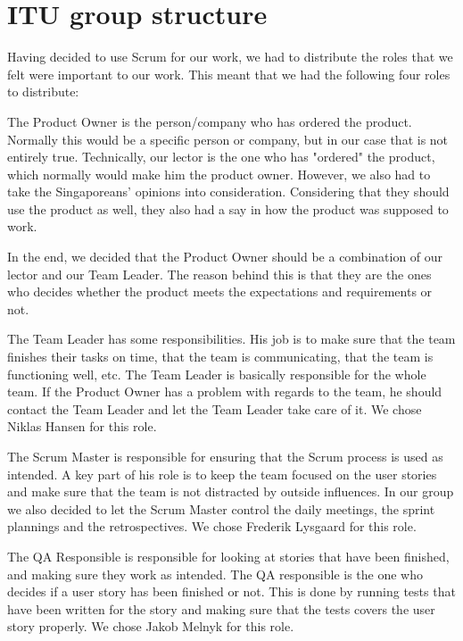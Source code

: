\section{ITU group structure}
\label{Collaboration_ITU}
Having decided to use Scrum for our work, we had to distribute the roles that we felt were important to our work. This meant that we had the following four roles to distribute:
\begin{my_description}
\item[Product Owner]
The Product Owner is the person/company who has ordered the product. Normally this would be a specific person or company, but in our case that is not entirely true. Technically, our lector is the one who has "ordered" the product, which normally would make him the product owner. However, we also had to take the Singaporeans' opinions into consideration. Considering that they should use the product as well, they also had a say in how the product was supposed to work.

In the end, we decided that the Product Owner should be a combination of our lector and our Team Leader. The reason behind this is that they are the ones who decides whether the product meets the expectations and requirements or not.

\item[Team Leader]
The Team Leader has some responsibilities. His job is to make sure that the team finishes their tasks on time, that the team is communicating, that the team is functioning well, etc. The Team Leader is basically responsible for the whole team. If the Product Owner has a problem with regards to the team, he should contact the Team Leader and let the Team Leader take care of it. We chose Niklas Hansen for this role.

\item[Scrum Master]
The Scrum Master is responsible for ensuring that the Scrum process is used as intended. A key part of his role is to keep the team focused on the user stories and make sure that the team is not distracted by outside influences. In our group we also decided to let the Scrum Master control the daily meetings, the sprint plannings and the retrospectives. We chose Frederik Lysgaard for this role.

\item[QA Responsible]
The QA Responsible is responsible for looking at stories that have been finished, and making sure they work as intended. The QA responsible is the one who decides if a user story has been finished or not. This is done by running tests that have been written for the story and making sure that the tests covers the user story properly. We chose Jakob Melnyk for this role.
\end{my_description}

